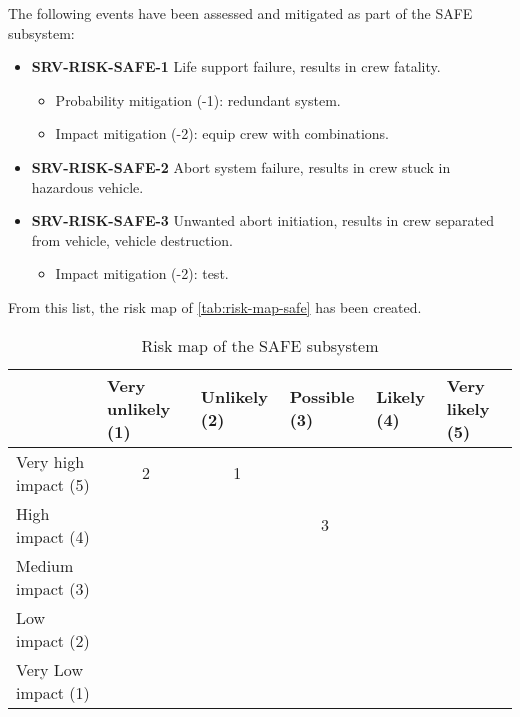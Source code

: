 The following events have been assessed and mitigated as part of the SAFE subsystem:

\begin{itemize}
	 \item \textbf{SRV-RISK-SAFE-1} Life support failure, results in crew fatality.
	\begin{itemize}
		 \item Probability mitigation (-1): redundant system.		 \item Impact mitigation (-2): equip crew with combinations.	\end{itemize}
	 \item \textbf{SRV-RISK-SAFE-2} Abort system failure, results in crew stuck in hazardous vehicle.
	 \item \textbf{SRV-RISK-SAFE-3} Unwanted abort initiation, results in crew separated from vehicle, vehicle destruction.
	\begin{itemize}
		 \item Impact mitigation (-2): test.	\end{itemize}
\end{itemize}

From this list, the risk map of \autoref{tab:risk-map-safe} has been created.

\begin{table}[H]
\centering
\caption{Risk map of the SAFE subsystem}
\label{tab:risk-map-safe}\begin{tabular}{l|c|c|c|c|c|}
\cline{2-6}
& \multicolumn{1}{l|}{Very unlikely (1)} & \multicolumn{1}{l|}{Unlikely (2)} & \multicolumn{1}{l|}{Possible (3)} & \multicolumn{1}{l|}{Likely (4)} & \multicolumn{1}{l|}{Very likely (5)} \\ \hline
\multicolumn{1}{|l|}{Very high impact (5)} & \cellcolor{rm-3}2 & \cellcolor{rm-3}1 & \cellcolor{rm-3} & \cellcolor{rm-3} & \cellcolor{rm-3}\\ \hline 
\multicolumn{1}{|l|}{High impact (4)} & \cellcolor{rm-2} & \cellcolor{rm-2} & \cellcolor{rm-2}3 & \cellcolor{rm-3} & \cellcolor{rm-3}\\ \hline 
\multicolumn{1}{|l|}{Medium impact (3)} & \cellcolor{rm-0} & \cellcolor{rm-1} & \cellcolor{rm-1} & \cellcolor{rm-2} & \cellcolor{rm-3}\\ \hline 
\multicolumn{1}{|l|}{Low impact (2)} & \cellcolor{rm-0} & \cellcolor{rm-0} & \cellcolor{rm-1} & \cellcolor{rm-2} & \cellcolor{rm-3}\\ \hline 
\multicolumn{1}{|l|}{Very Low impact (1)} & \cellcolor{rm-0} & \cellcolor{rm-0} & \cellcolor{rm-0} & \cellcolor{rm-2} & \cellcolor{rm-3}\\ \hline 
\end{tabular} 
\end{table}

